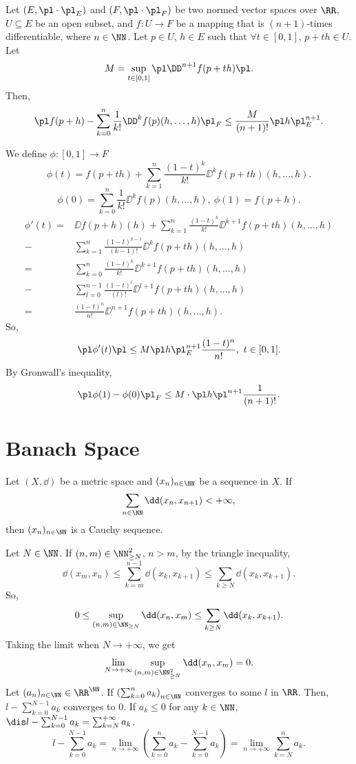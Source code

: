 \begin{theoremenv}
    Let $(E,\pl \cdot\pl_E)$ and $(F,\pl \cdot\pl_F)$ be two normed vector spaces over $\RR$, $U\subseteq E$ be an open subset, and $f: U\longrightarrow F$ be a mapping that is $(n+1)$-times differentiable, where $n\in \NN$.
    Let $p\in U$, $h\in E$ such that $\forall t\in [0,1]$, $p+th\in U$. Let 
    $$M=\sup_{t\in [0,1]}\pl \DD^{n+1} f(p+th)\pl.$$
    Then,
    $$\pl f(p+h)-\sum_{k=0}^{n}\frac{1}{k!}\DD^k f(p)(h,\ldots,h)\pl_F \le \frac{M}{(n+1)!}\pl h\pl_E^{n+1}.$$
\end{theoremenv}
\begin{proofenv}
    We define $\phi:[0,1]\longrightarrow F$
    $$ \phi(t)=f(p+th)+\sum_{k=1}^{n}\frac{(1-t)^k}{k!}\DD^k f(p+th)(h,\ldots,h).$$
    $$ \phi(0)=\sum_{k=0}^{n}\frac{1}{k!}\DD^k f(p)(h,\ldots,h),\ \phi(1)=f(p+h).$$
    \begin{align*}
        \phi'(t)=& \DD f(p+h)(h)+ \sum_{k=1}^{n}\frac{(1-t)^k}{k!}\DD^{k+1} f(p+th)(h,\ldots,h)\\
        -& \sum_{k=1}^{n}\frac{(1-t)^{k-1}}{(k-1)!}\DD^k f(p+th)(h,\ldots,h)\\
        =& \sum_{k=0}^{n}\frac{(1-t)^k}{k!}\DD^{k+1} f(p+th)(h,\ldots,h)\\
        -&\sum_{l=0}^{n-1}\frac{(1-t)^{l}}{(l)!}\DD^{l+1} f(p+th)(h,\ldots,h)\\
        =& \frac{(1-t)^n}{n!}\DD^{n+1} f(p+th)(h,\ldots,h).
    \end{align*}
    So, 
    $$ \pl \phi'(t)\pl\le M\pl h\pl_E^{n+1} \frac{(1-t)^n}{n!},\ t\in [0,1].$$
    By Gronwall's inequality,
    $$ \pl \phi(1)-\phi(0)\pl_F \le M\cdot \pl h\pl ^{n+1}\frac{1}{(n+1)!}.$$
\end{proofenv}


\section{Banach Space}
\begin{propositionenv}
    Let $(X,\dd)$ be a metric space and $(x_n)_{n\in \NN}$ be a sequence in $X$. If 
    $$\sum_{n\in \NN}\dd(x_n,x_{n+1})<+\infty,$$
    then $(x_n)_{n\in \NN}$ is a Cauchy sequence.
\end{propositionenv}
\begin{proofenv}
    Let $N\in \NN$. If $(n,m)\in \NN_{\ge N}^2$, $n>m$, by the triangle inequality, 
    $$ \dd(x_m,x_n)\le \sum_{k=m}^{n-1}\dd(x_k,x_{k+1})\le \sum_{k\ge N}\dd(x_k,x_{k+1}).$$
    So, 
    $$ 0\le \sup_{(n,m)\in \NN_{\ge N}} \dd(x_n,x_m)\le \sum_{k\ge N}\dd(x_k,x_{k+1}).$$
    Taking the limit when $N\rightarrow +\infty$, we get 
    $$ \lim_{N\rightarrow +\infty}\sup_{(n,m)\in \NN_{\ge N}^2} \dd(x_n,x_m)=0.$$
    Let $(a_n)_{n\in\NN}\in \RR^\NN$. If $ \left(\sum_{k=0}^{n}a_k\right)_{n\in\NN}$ converges to some $l$ in $\RR$. Then, $l-\sum_{k=0}^{N-1}a_k$ converges to $0$. If $a_k\le 0$ for any $k\in\NN$, $\dis l-\sum_{k=0}^{N-1}a_k=\sum_{k=N}^{+\infty}a_k$.
    $$ l-\sum_{k=0}^{N-1}a_k=\lim_{n\rightarrow +\infty}\left(\sum_{k=0}^{n}a_k-\sum_{k=0}^{N-1}a_k\right)=\lim_{n\rightarrow +\infty}\sum_{k=N}^{n}a_k.$$

\end{proofenv}

